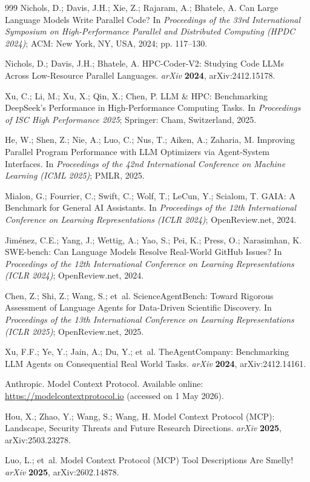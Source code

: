 \documentclass[preprints,article,submit,pdftex,moreauthors]{Definitions/mdpi}
\begin{document}
{\begin{thebibliography}{999}
Nichols, D.; Davis, J.H.; Xie, Z.; Rajaram, A.; Bhatele, A.
Can Large Language Models Write Parallel Code?
In \textit{Proceedings of the 33rd International Symposium on High-Performance Parallel and Distributed Computing (HPDC 2024)};
ACM: New York, NY, USA, 2024; pp. 117--130.

Nichols, D.; Davis, J.H.; Bhatele, A.
HPC-Coder-V2: Studying Code LLMs Across Low-Resource Parallel Languages.
\textit{arXiv} \textbf{2024}, arXiv:2412.15178.

Xu, C.; Li, M.; Xu, X.; Qin, X.; Chen, P.
LLM \& HPC: Benchmarking DeepSeek's Performance in High-Performance Computing Tasks.
In \textit{Proceedings of ISC High Performance 2025};
Springer: Cham, Switzerland, 2025.

He, W.; Shen, Z.; Nie, A.; Luo, C.; Nus, T.; Aiken, A.; Zaharia, M.
Improving Parallel Program Performance with LLM Optimizers via Agent-System Interfaces.
In \textit{Proceedings of the 42nd International Conference on Machine Learning (ICML 2025)};
PMLR, 2025.

Mialon, G.; Fourrier, C.; Swift, C.; Wolf, T.; LeCun, Y.; Scialom, T.
GAIA: A Benchmark for General AI Assistants.
In \textit{Proceedings of the 12th International Conference on Learning Representations (ICLR 2024)};
OpenReview.net, 2024.

Jim\'{e}nez, C.E.; Yang, J.; Wettig, A.; Yao, S.; Pei, K.; Press, O.; Narasimhan, K.
SWE-bench: Can Language Models Resolve Real-World GitHub Issues?
In \textit{Proceedings of the 12th International Conference on Learning Representations (ICLR 2024)};
OpenReview.net, 2024.

Chen, Z.; Shi, Z.; Wang, S.; et~al.
ScienceAgentBench: Toward Rigorous Assessment of Language Agents for Data-Driven Scientific Discovery.
In \textit{Proceedings of the 13th International Conference on Learning Representations (ICLR 2025)};
OpenReview.net, 2025.

Xu, F.F.; Ye, Y.; Jain, A.; Du, Y.; et~al.
TheAgentCompany: Benchmarking LLM Agents on Consequential Real World Tasks.
\textit{arXiv} \textbf{2024}, arXiv:2412.14161.

Anthropic.
Model Context Protocol.
Available online: \url{https://modelcontextprotocol.io} (accessed on 1 May 2026).

Hou, X.; Zhao, Y.; Wang, S.; Wang, H.
Model Context Protocol (MCP): Landscape, Security Threats and Future Research Directions.
\textit{arXiv} \textbf{2025}, arXiv:2503.23278.

Luo, L.; et~al.
Model Context Protocol (MCP) Tool Descriptions Are Smelly!
\textit{arXiv} \textbf{2025}, arXiv:2602.14878.

\end{thebibliography}
}
\end{document}
